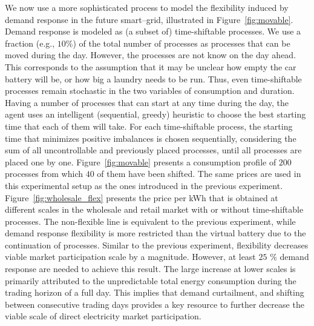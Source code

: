 \documentclass[conference]{IEEEtran}
\begin{document}
We now use a more sophisticated process to model the flexibility induced by demand response in the future smart--grid, illustrated in Figure~\ref{fig:movable}. Demand response is modeled as (a subset of) time-shiftable processes. We use a fraction (e.g., $10\%$) of the total number of processes as processes that can be moved during the day. However, the processes are not know on the day ahead. This corresponds to the assumption that it may be unclear how empty the car battery will be, or how big a laundry needs to be run. Thus, even time-shiftable processes remain stochastic in the two variables of consumption and duration.
Having a number of processes that can start at any time during the day, the agent uses an intelligent (sequential, greedy) heuristic to choose the best starting time that each of them will take. For each time-shiftable process, the starting time that minimizes positive imbalances is chosen sequentially, considering the sum of all uncontrollable and previously placed processes, until all processes are placed one by one. Figure~\ref{fig:movable} presents a consumption profile of $200$ processes from which $40$ of them have been shifted. The same prices are used in this experimental setup as the ones introduced in the previous experiment. Figure~\ref{fig:wholesale_flex} presents the price per kWh that is obtained at different scales in the wholesale and retail market with or without time-shiftable processes. The non-flexible line is equivalent to the previous experiment, while demand response flexibility is more restricted than the virtual battery due to the continuation of processes. Similar to the previous experiment, flexibility decreases viable market participation scale by a magnitude. However, at least $25$ \% demand response are needed to achieve this result.
The large increase at lower scales is primarily attributed to the unpredictable total energy consumption during the trading horizon of a full day. This implies that demand curtailment, and shifting between consecutive trading days provides a key resource to further decrease the viable scale of direct electricity market participation.
\end{document}
